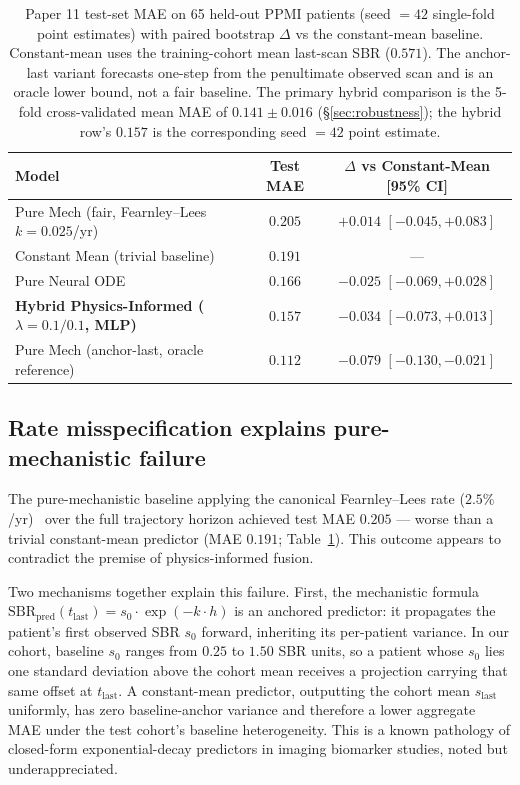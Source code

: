 \begin{table}[htbp]
\centering
\caption{Paper 11 test-set MAE on 65 held-out PPMI patients (seed $=42$ single-fold point estimates) with paired bootstrap $\Delta$ vs the constant-mean baseline. Constant-mean uses the training-cohort mean last-scan SBR ($0.571$). The anchor-last variant forecasts one-step from the penultimate observed scan and is an oracle lower bound, not a fair baseline. The primary hybrid comparison is the 5-fold cross-validated mean MAE of $0.141 \pm 0.016$ (\S\ref{sec:robustness}); the hybrid row's $0.157$ is the corresponding seed $=42$ point estimate.}
\label{tab:p11_model_comparison}
\small
\begin{tabular}{lcc}
\toprule
Model & Test MAE & $\Delta$ vs Constant-Mean [95\% CI] \\
\midrule
Pure Mech (fair, Fearnley--Lees $k=0.025$/yr) & $0.205$ & $+0.014$ $[-0.045, +0.083]$ \\
Constant Mean (trivial baseline) & $0.191$ & --- \\
Pure Neural ODE & $0.166$ & $-0.025$ $[-0.069, +0.028]$ \\
\textbf{Hybrid Physics-Informed ($\lambda{=}0.1/0.1$, MLP)} & $\mathbf{0.157}$ & $\mathbf{-0.034}$ $\mathbf{[-0.073, +0.013]}$ \\
Pure Mech (anchor-last, oracle reference) & $0.112$ & $-0.079$ $[-0.130, -0.021]$ \\
\bottomrule
\end{tabular}
\end{table}

\subsection{Rate misspecification explains pure-mechanistic failure}

The pure-mechanistic baseline applying the canonical Fearnley--Lees rate ($2.5\%$/yr)~\cite{fearnleyLees1991} over the full trajectory horizon achieved test MAE $0.205$ --- worse than a trivial constant-mean predictor (MAE $0.191$; Table~\ref{tab:p11_model_comparison}). This outcome appears to contradict the premise of physics-informed fusion.

Two mechanisms together explain this failure. First, the mechanistic formula $\mathrm{SBR}_\text{pred}(t_\text{last}) = s_0 \cdot \exp(-k \cdot h)$ is an anchored predictor: it propagates the patient's first observed SBR $s_0$ forward, inheriting its per-patient variance. In our cohort, baseline $s_0$ ranges from $0.25$ to $1.50$ SBR units, so a patient whose $s_0$ lies one standard deviation above the cohort mean receives a projection carrying that same offset at $t_\text{last}$. A constant-mean predictor, outputting the cohort mean $s_{\text{last}}$ uniformly, has zero baseline-anchor variance and therefore a lower aggregate MAE under the test cohort's baseline heterogeneity. This is a known pathology of closed-form exponential-decay predictors in imaging biomarker studies, noted but underappreciated.

